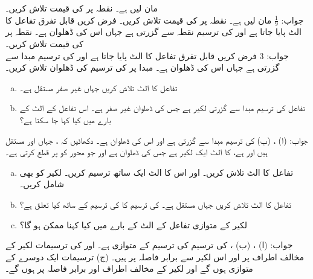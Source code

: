 مان لیں  ہے۔ نقطہ  پر  کی قیمت تلاش کریں۔\\
جواب:\quad
$\tfrac{1}{9}$
مان لیں  ہے۔ نقطہ  پر  کی قیمت تلاش کریں۔
فرض کریں قابل تفرق تفاعل  کا الٹ پایا جاتا ہے اور  کی ترسیم نقطہ  سے گزرتی ہے جہاں اس کی ڈھلوان  ہے۔ نقطہ  پر  کی قیمت تلاش کریں۔\\
جواب:\quad
$3$
فرض کریں قابل تفرق تفاعل  کا الٹ پایا جاتا ہے اور  کی ترسیم مبدا سے گزرتی ہے جہاں اس کی ڈھلوان  ہے۔ مبدا پر  کی ترسیم کی ڈھلوان تلاش کریں۔
\begin{enumerate}[a.]
\item
تفاعل  کا الٹ تلاش کریں جہاں  غیر صفر مستقل ہے۔
\item
تفاعل  کی ترسیم مبدا سے گزرتی لکیر ہے جس کی ڈھلوان  غیر صفر ہے۔ اس تفاعل کے الٹ کے بارے میں کیا کہا جا سکتا ہے؟
\end{enumerate}
جواب:\quad
(ا) ، (ب)  کی ترسیم مبدا سے گزرتی ہے اور اس کی ڈھلوان  ہے۔ 
دکھائیں کہ ، جہاں  اور  مستقل ہیں اور  ہے، کا الٹ ایک لکیر ہے جس کی
 ڈھلوان  ہے اور جو محور  کو  پر قطع کرتی ہے۔
\begin{enumerate}[a.]
\item
تفاعل  کا الٹ تلاش کریں۔  اور اس کا الٹ ایک ساتھ ترسیم کریں۔ لکیر  کو بھی شامل کریں۔
\item
تفاعل   کا الٹ تلاش کریں جہاں  مستقل ہے۔  کی ترسیم کا  کی ترسیم کے ساتھ کیا تعلق ہے؟
\item
لکیر  کے متوازی تفاعل کے الٹ کے بارے میں کیا کہنا ممکن ہو گا؟
\end{enumerate}
جواب:\quad
(ا) ، (ب) ،  کی ترسیم  کی ترسیم کے متوازی ہے۔ اور  کی ترسیمات لکیر  کے مخالف اطراف پر اور اس لکیر سے برابر فاصلہ پر ہیں۔ (ج) ترسیمات ایک دوسرے کے متوازی ہوں گے اور لکیر  کے مخالف اطراف اور برابر فاصلہ پر ہوں گے۔
